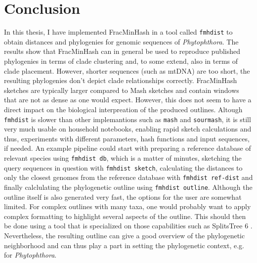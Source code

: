 \chapter{Conclusion}
\label{sec:conc}
In this thesis, I have implemented FracMinHash in a tool called \texttt{fmhdist}
to obtain distances and phylogenies for genomic sequences of
\textit{Phytophthora}. The results show that FracMinHash can in general be used
to reproduce published phylogenies in terms of clade clustering and, to some
extend, also in terms of clade placement. However, shorter sequences (such as
mtDNA) are too short, the resulting phylogenies don't depict clade relationships
correctly. FracMinHash sketches are typically larger compared to Mash sketches
and contain windows that are not as dense as one would expect. However, this
does not seem to have a direct impact on the biological interpreation of the
produced outlines.  
Altough \texttt{fmhdist} is slower than other implemantions such as
\texttt{mash} and \texttt{sourmash}, it is still very much usable on household
notebooks, enabling rapid sketch calculations and thus, experiments with
different parameters, hash functions and input sequences, if needed. An example
pipeline could start with preparing a reference database of relevant species
using \texttt{fmhdist db}, which is a matter of minutes, sketching the query
sequences in question with \texttt{fmhdist sketch}, calculating the distances to
only the closest genomes from the reference database with \texttt{fmhdist
ref-dist} and finally calclulating the phylogenetic outline using
\texttt{fmhdist outline}. Although the outline itself is also generated very
fast, the options for the user are somewhat limited. For complex outlines with
many taxa, one would probably want to apply complex formatting to highlight
several aspects of the outline. This should then be done using a tool that is
specialized on those capabilities such as SplitsTree 6
\cite{husonApplicationPhylogeneticNetworks2006}. Nevertheless, the resulting
outline can give a good overview of the phylogenetic neighborhood and can thus
play a part in setting the phylogenetic context, e.g. for \textit{Phytophthora}.